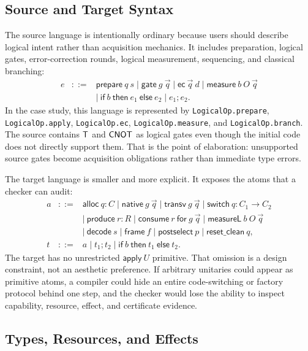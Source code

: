 \subsection{Source and Target Syntax}

The source language is intentionally ordinary because users should describe logical intent rather than acquisition mechanics.
It includes preparation, logical gates, error-correction rounds, logical measurement, sequencing, and classical branching:
\[
\begin{array}{rcl}
e &::=& \mathsf{prepare}\ q\ s
  \mid \mathsf{gate}\ g\ \vec q
  \mid \mathsf{ec}\ \vec q\ d
  \mid \mathsf{measure}\ b\ O\ \vec q \\
  && \mid\ \mathsf{if}\ b\ \mathsf{then}\ e_1\ \mathsf{else}\ e_2
  \mid e_1;e_2.
\end{array}
\]
In the case study, this language is represented by \texttt{LogicalOp.prepare}, \texttt{LogicalOp.apply}, \texttt{LogicalOp.ec}, \texttt{LogicalOp.measure}, and \texttt{LogicalOp.branch}.
The source contains $\mathsf{T}$ and $\mathsf{CNOT}$ as logical gates even though the initial code does not directly support them.
That is the point of elaboration: unsupported source gates become acquisition obligations rather than immediate type errors.

The target language is smaller and more explicit.
It exposes the atoms that a checker can audit:
\[
\begin{array}{rcl}
a &::=& \mathsf{alloc}\ q:C
  \mid \mathsf{native}\ g\ \vec q
  \mid \mathsf{transv}\ g\ \vec q
  \mid \mathsf{switch}\ q:C_1\to C_2 \\
  && \mid\ \mathsf{produce}\ r:R
  \mid \mathsf{consume}\ r\ \mathsf{for}\ g\ \vec q
  \mid \mathsf{measureL}\ b\ O\ \vec q \\
  && \mid\ \mathsf{decode}\ s
  \mid \mathsf{frame}\ f
  \mid \mathsf{postselect}\ p
  \mid \mathsf{reset\_clean}\ q, \\
t &::=& a \mid t_1;t_2 \mid \mathsf{if}\ b\ \mathsf{then}\ t_1\ \mathsf{else}\ t_2.
\end{array}
\]
The target has no unrestricted $\mathsf{apply}\ U$ primitive.
That omission is a design constraint, not an aesthetic preference.
If arbitrary unitaries could appear as primitive atoms, a compiler could hide an entire code-switching or factory protocol behind one step, and the checker would lose the ability to inspect capability, resource, effect, and certificate evidence.

\subsection{Types, Resources, and Effects}

